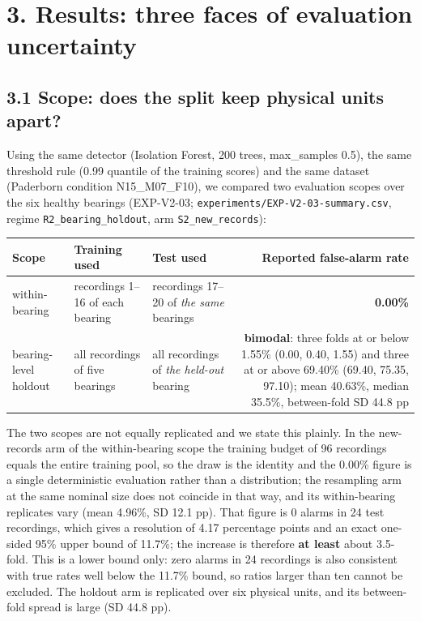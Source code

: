 \documentclass[11pt]{article}
\newcommand{\code}[1]{\texttt{#1}}
\begin{document}
\section{3. Results: three faces of evaluation uncertainty}

\subsection{3.1 Scope: does the split keep physical units apart?}

Using the same detector (Isolation Forest, 200 trees, max\_samples 0.5), the same threshold rule (0.99 quantile of the training scores) and the same dataset (Paderborn condition N15\_M07\_F10), we compared two evaluation scopes over the six healthy bearings (EXP-V2-03; \code{experiments/EXP-V2-03-summary.csv}, regime \code{R2\_bearing\_holdout}, arm \code{S2\_new\_records}):

\begin{table}[t]
\centering
\small
\begin{tabular}{lllr}
\toprule
Scope & Training used & Test used & Reported false-alarm rate \\
\midrule
within-bearing & recordings 1--16 of each bearing & recordings 17--20 of \emph{the same} bearings & \textbf{0.00\%} \\
bearing-level holdout & all recordings of five bearings & all recordings of \emph{the held-out} bearing & \textbf{bimodal}: three folds at or below 1.55\% (0.00, 0.40, 1.55) and three at or above 69.40\% (69.40, 75.35, 97.10); mean 40.63\%, median 35.5\%, between-fold SD 44.8 pp \\
\bottomrule
\end{tabular}
\end{table}

The two scopes are not equally replicated and we state this plainly. In the new-records arm of the within-bearing scope the training budget of 96 recordings equals the entire training pool, so the draw is the identity and the 0.00\% figure is a single deterministic evaluation rather than a distribution; the resampling arm at the same nominal size does not coincide in that way, and its within-bearing replicates vary (mean 4.96\%, SD 12.1 pp). That figure is 0 alarms in 24 test recordings, which gives a resolution of 4.17 percentage points and an exact one-sided 95\% upper bound of 11.7\%; the increase is therefore \textbf{at least} about 3.5-fold. This is a lower bound only: zero alarms in 24 recordings is also consistent with true rates well below the 11.7\% bound, so ratios larger than ten cannot be excluded. The holdout arm is replicated over six physical units, and its between-fold spread is large (SD 44.8 pp).
\end{document}
